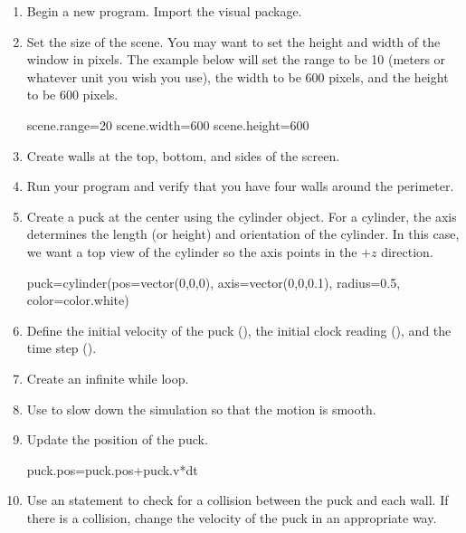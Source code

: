 \begin{enumerate}
\item Begin a new program. Import the visual package.

\item Set the size of the scene. You may want to set the height and width of the window in pixels. The example below will set the range to be 10 (meters or whatever unit you wish you use), the width to be 600 pixels, and the height to be 600 pixels.

\begin{myvpython}
scene.range=20
scene.width=600
scene.height=600
\end{myvpython}

\item Create walls at the top, bottom, and sides of the screen.

\item Run your program and verify that you have four walls around the perimeter.

\item Create a puck at the center using the cylinder object. For a cylinder, the axis determines the length (or height) and orientation of the cylinder. In this case, we want a top view of the cylinder so the axis points in the $+z$ direction.

\begin{myvpython}
puck=cylinder(pos=vector(0,0,0), axis=vector(0,0,0.1), radius=0.5, color=color.white)
\end{myvpython}

\item Define the initial velocity of the puck (), the initial clock reading (), and the time step ().

\item Create an infinite while loop.

\item Use  to slow down the simulation so that the motion is smooth.

\item Update the position of the puck.

\begin{myvpython}
    puck.pos=puck.pos+puck.v*dt
\end{myvpython}

\item Use an  statement to check for a collision between the puck and each wall. If there is a collision, change the velocity of the puck in an appropriate way.


\end{enumerate}
